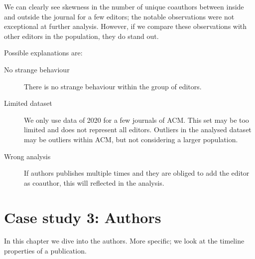 \documentclass{ou-report}
\newcommand{\outline}[1]{{\color{blue} #1}}
\begin{document}

We can clearly see skewness in the number of unique coauthors between 
inside and outside the journal for a few editors; the notable observations were 
not exceptional at further analysis.
However, if we compare these observations with other editors in the population,
they do stand out.

Possible explanations are:
\begin{description}
    \item[No strange behaviour] There is no strange behaviour within the group 
        of editors.
    \item[Limited dataset] We only use data of 2020 for a few journals of ACM. 
        This set may be too limited and does not represent all editors. Outliers
        in the analysed dataset may be outliers within ACM, but not considering
        a larger population.
    \item[Wrong analysis] If authors publishes multiple times and they are 
        obliged to add the editor as coauthor, this will reflected in the 
        analysis.
\end{description}

\chapter{Case study 3: Authors}
\label{chp:case3}
In this chapter we dive into the authors. More specific; we look at the timeline
properties of a publication.
\end{document}

